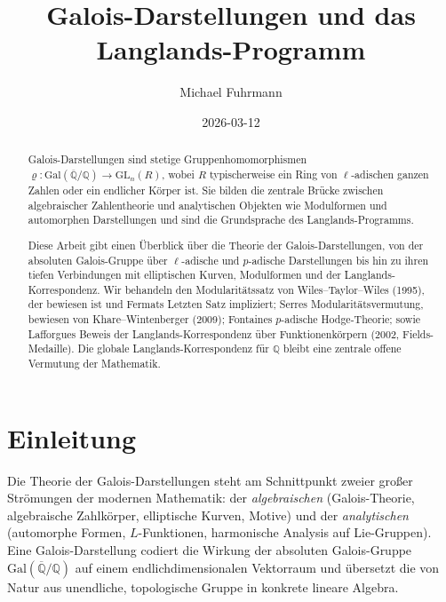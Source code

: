 \documentclass[a4paper,12pt]{amsart}
\theoremstyle{definition}
\theoremstyle{remark}
\newcommand{\GQ}{\mathrm{Gal}(\overline{\mathbb{Q}}/\mathbb{Q})}
\newcommand{\GL}{\mathrm{GL}}
\begin{document}
\title{Galois-Darstellungen und das Langlands-Programm}

\author{Michael Fuhrmann}
\address{Specialist Mathematics Project, Build 143}
\date{2026-03-12}

\begin{abstract}
Galois-Darstellungen sind stetige Gruppenhomomorphismen
$\varrho\colon \mathrm{Gal}(\overline{\mathbb{Q}}/\mathbb{Q}) \to \GL_n(R)$,
wobei $R$ typischerweise ein Ring von $\ell$-adischen ganzen Zahlen oder ein endlicher
Körper ist. Sie bilden die zentrale Brücke zwischen algebraischer Zahlentheorie und
analytischen Objekten wie Modulformen und automorphen Darstellungen und sind die
Grundsprache des Langlands-Programms.

Diese Arbeit gibt einen Überblick über die Theorie der Galois-Darstellungen, von der
absoluten Galois-Gruppe über $\ell$-adische und $p$-adische Darstellungen bis hin zu
ihren tiefen Verbindungen mit elliptischen Kurven, Modulformen und der Langlands-Korrespondenz.
Wir behandeln den Modularitätssatz von Wiles--Taylor--Wiles (1995), der bewiesen ist
und Fermats Letzten Satz impliziert; Serres Modularitätsvermutung, bewiesen von
Khare--Wintenberger (2009); Fontaines $p$-adische Hodge-Theorie; sowie Lafforgues
Beweis der Langlands-Korrespondenz über Funktionenkörpern (2002, Fields-Medaille).
Die globale Langlands-Korrespondenz für $\mathbb{Q}$ bleibt eine zentrale offene
Vermutung der Mathematik.
\end{abstract}

\maketitle

\tableofcontents

\section{Einleitung}

Die Theorie der Galois-Darstellungen steht am Schnittpunkt zweier großer Strömungen
der modernen Mathematik: der \emph{algebraischen} (Galois-Theorie, algebraische
Zahlkörper, elliptische Kurven, Motive) und der \emph{analytischen} (automorphe
Formen, $L$-Funktionen, harmonische Analysis auf Lie-Gruppen). Eine Galois-Darstellung
codiert die Wirkung der absoluten Galois-Gruppe $\GQ$ auf einem endlichdimensionalen
Vektorraum und übersetzt die von Natur aus unendliche, topologische Gruppe in
konkrete lineare Algebra.
\end{document}
